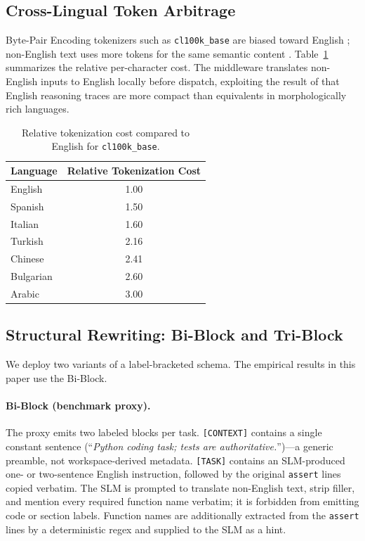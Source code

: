 \documentclass[11pt,a4paper,twocolumn]{article}
\begin{document}
\subsection{Cross-Lingual Token Arbitrage}
Byte-Pair Encoding tokenizers such as \texttt{cl100k\_base} are biased toward English \cite{teklehaymanot2025tokenization}; non-English text uses more tokens for the same semantic content \cite{petrov2023language}. Table~\ref{tab:tokenization-overhead} summarizes the relative per-character cost. The middleware translates non-English inputs to English locally before dispatch, exploiting the result of \cite{ahuja2025efficientxlang} that English reasoning traces are more compact than equivalents in morphologically rich languages.

\begin{table}[h]
\centering
\small
\begin{tabular}{lc}
\toprule
\textbf{Language} & \textbf{Relative Tokenization Cost} \\
\midrule
English & 1.00 \\
Spanish & 1.50 \\
Italian & 1.60 \\
Turkish & 2.16 \\
Chinese & 2.41 \\
Bulgarian & 2.60 \\
Arabic & 3.00 \\
\bottomrule
\end{tabular}
\caption{Relative tokenization cost compared to English for \texttt{cl100k\_base}.}
\label{tab:tokenization-overhead}
\end{table}

\subsection{Structural Rewriting: Bi-Block and Tri-Block}
\label{sec:structure}
We deploy two variants of a label-bracketed schema. The empirical results in this paper use the Bi-Block.

\paragraph{Bi-Block (benchmark proxy).} The proxy emits two labeled blocks per task. \texttt{[CONTEXT]} contains a single constant sentence (``\textit{Python coding task; tests are authoritative.}'')---a generic preamble, not workspace-derived metadata. \texttt{[TASK]} contains an SLM-produced one- or two-sentence English instruction, followed by the original \texttt{assert} lines copied verbatim. The SLM is prompted to translate non-English text, strip filler, and mention every required function name verbatim; it is forbidden from emitting code or section labels. Function names are additionally extracted from the \texttt{assert} lines by a deterministic regex and supplied to the SLM as a hint.
\end{document}
